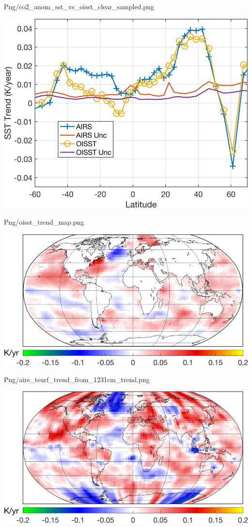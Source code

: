 \documentclass[presentation]{beamer}
\begin{document}
\begin{frame}[label={sec:org4f34529}]{Png/co2\_anom\_sst\_vs\_oisst\_clear\_sampled.png}
\begin{center}
\includegraphics[width=0.7\linewidth]{./Figs/Png/co2_anom_sst_vs_oisst_clear_sampled.png}
\end{center}
\end{frame}

\begin{frame}[label={sec:orgf1c643a}]{Png/oisst\_trend\_map.png}
\begin{center}
\includegraphics[width=0.7\linewidth]{./Figs/Png/oisst_trend_map.png}
\end{center}
\end{frame}

\begin{frame}[label={sec:org1275d71}]{Png/airs\_tsurf\_trend\_from\_1231cm\_trend.png}
\begin{center}
\includegraphics[width=0.7\linewidth]{./Figs/Png/airs_tsurf_trend_from_1231cm_trend.png}
\end{center}
\end{frame}
\end{document}
